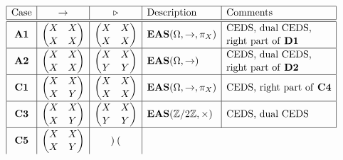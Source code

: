 \documentclass[10pt,a4paper]{amsart}
\numberwithin{equation}{section}
\newcommand{\eas}{\mathbf{EAS}}
\begin{document}
$$\renewcommand{\arraystretch}{1.1}
\begin{array}{|c|c|c|l|l|}
\hline \text{Case}&\rightarrow&\triangleright&\text{Description}&\text{Comments}\\
\hline \hline \mathbf{A1}&\begin{pmatrix}
X&X\\X&X
\end{pmatrix}&
\begin{pmatrix}
X&X\\X&X
\end{pmatrix}&\eas(\Omega,\rightarrow,\pi_X)&\begin{array}{@{}l@{}}\text{CEDS, dual CEDS,}\\
 \text{right part of \textbf{D1}}\end{array}\\
\hline \mathbf{A2}&\begin{pmatrix}
X&X\\X&X
\end{pmatrix}&
\begin{pmatrix}
X&X\\Y&Y
\end{pmatrix}&\eas(\Omega,\rightarrow)&\begin{array}{@{}l@{}}\text{CEDS, dual CEDS,}\\
\text{right part of \textbf{D2}}\end{array}\\
\hline \mathbf{C1} &\begin{pmatrix}
X&X\\X&Y
\end{pmatrix}&
\begin{pmatrix}
X&X\\X&X
\end{pmatrix}&\eas(\Omega,\rightarrow,\pi_X)&\text{CEDS, right part of \textbf{C4}}\\
\hline \mathbf{C3}&\begin{pmatrix}
X&X\\X&Y
\end{pmatrix}&
\begin{pmatrix}
X&X\\Y&Y
\end{pmatrix}&\eas(\mathbb{Z}/2\mathbb{Z},\times)&\text{CEDS, dual CEDS}\\
\hline \mathbf{C5} &\begin{pmatrix}
X&X\\X&Y
\end{pmatrix}&
\begin{pmatrix}

\end{pmatrix}
\end{array}$$
\end{document}
